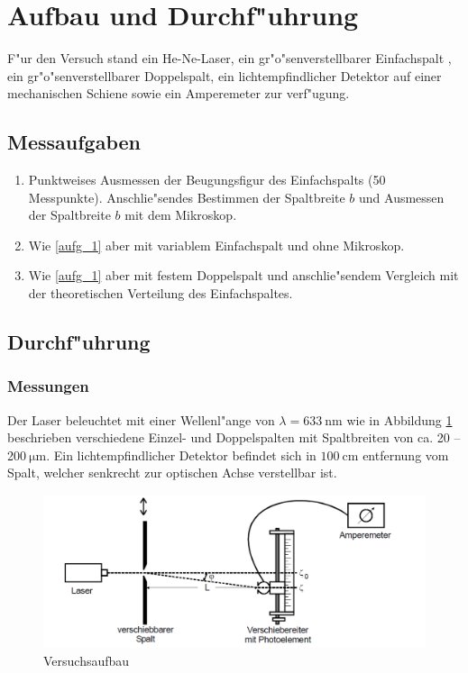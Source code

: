 \section{Aufbau und Durchf"uhrung}
	\label{sec:durchfueuhrung}
	F"ur den Versuch stand ein He-Ne-Laser, ein gr"o"senverstellbarer Einfachspalt , ein gr"o\-"sen\-ver\-stell\-bar\-er Doppelspalt, ein lichtempfindlicher Detektor auf einer mechanischen Schiene sowie ein Amperemeter zur verf"ugung.

	\subsection{Messaufgaben}
		\begin{enumerate}
			\item \label{aufg_1} Punktweises Ausmessen der Beugungsfigur des Einfachspalts (50 Messpunkte). Anschlie"sendes Bestimmen der Spaltbreite $b$ und Ausmessen der Spaltbreite $b$ mit dem Mikroskop.

			\item \label{aufg_2} Wie \ref{aufg_1} aber mit variablem Einfachspalt und ohne Mikroskop. 

			\item \label{aufg_3} Wie \ref{aufg_1} aber mit festem Doppelspalt und anschlie"sendem Vergleich mit der theo\-re\-tisch\-en Verteilung des Einfachspaltes.
		\end{enumerate}

	\subsection{Durchf"uhrung}
		\label{sec:durchfuehrung}
		\subsubsection{Messungen}
			\label{sec:messung}

			Der Laser beleuchtet mit einer Wellenl"ange von $\lambda = \SI{633}{\nano \meter}$ wie in Abbildung \ref{Versuchsaufbau} be\-schrie\-ben verschiedene Einzel- und Doppelspalten mit Spaltbreiten von ca. 20 -- 200$\SI{}{\micro \meter}$. Ein licht\-emp\-find\-lich\-er Detektor befindet sich in $\SI{100}{\centi \meter}$ entfernung vom Spalt, welcher senkrecht zur optischen Achse verstellbar ist.

			\begin{figure}[h]
					\centering
					\includegraphics[width = 14cm]{Versuchsaufbau.png}
					\caption{Versuchsaufbau \cite{anleitung}}
					\label{Versuchsaufbau}
			\end{figure}

